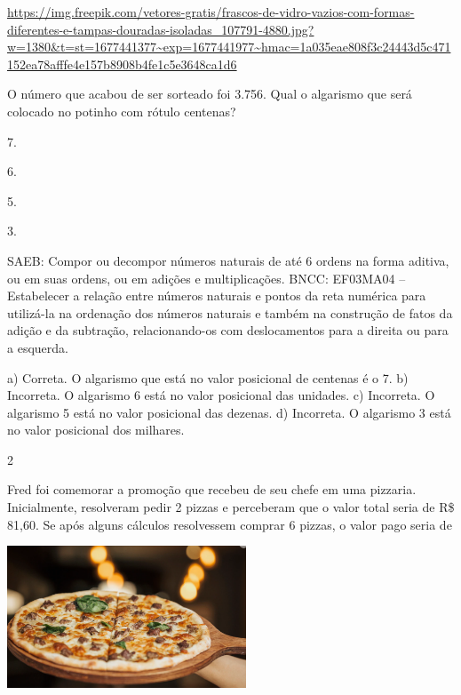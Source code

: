 \begin{multicols}{2}
\begin{enumerate}
{%

\url{https://img.freepik.com/vetores-gratis/frascos-de-vidro-vazios-com-formas-diferentes-e-tampas-douradas-isoladas_107791-4880.jpg?w=1380\&t=st=1677441377~exp=1677441977~hmac=1a035eae808f3c24443d5c471152ea78afffe4e157b8908b4fe1c5e3648ca1d6}

O número que acabou de ser sorteado foi 3.756. Qual o algarismo que será colocado no potinho com rótulo centenas?

\begin{escolha}

\item
  7.
\item
  6.
\item
  5.
\item
  3.
\end{escolha}

SAEB: Compor ou decompor números naturais de até 6 ordens na forma aditiva, ou em suas ordens, ou em adições e multiplicações.
BNCC: EF03MA04 -- Estabelecer a relação entre números naturais e pontos da reta numérica para
utilizá-la na ordenação dos números naturais e também na construção de fatos da adição e da
subtração, relacionando-os com deslocamentos para a direita ou para a esquerda.

a) Correta. O algarismo que está no valor posicional de centenas é o 7.
b) Incorreta. O algarismo 6 está no valor posicional das unidades.
c) Incorreta. O algarismo 5 está no valor posicional das dezenas.
d) Incorreta. O algarismo 3 está no valor posicional dos milhares.

\num{2}

Fred foi comemorar a promoção que recebeu de seu chefe em uma pizzaria. Inicialmente, resolveram pedir 2 pizzas e perceberam que o valor total seria de R\$ 81,60. Se após alguns cálculos resolvessem comprar 6
pizzas, o valor pago seria de

\includegraphics[width=2.80000in,height=1.66867in]{media/image131.png}

}
\end{enumerate}
\end{multicols}

